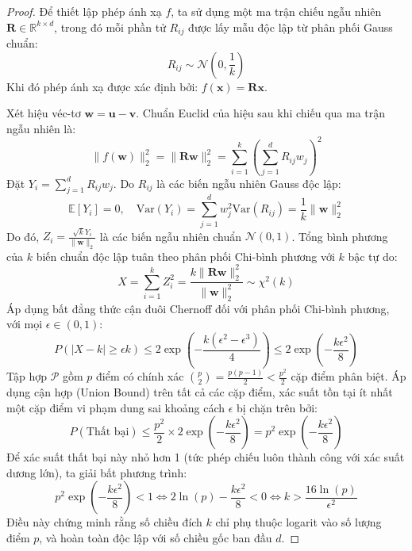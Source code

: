 \begin{proof}
Để thiết lập phép ánh xạ $f$, ta sử dụng một ma trận chiếu ngẫu nhiên $\mathbf{R} \in \mathbb{R}^{k \times d}$, trong đó mỗi phần tử $R_{ij}$ được lấy mẫu độc lập từ phân phối Gauss chuẩn:
\begin{equation*}
R_{ij} \sim \mathcal{N}\left(0, \frac{1}{k}\right)
\end{equation*}
Khi đó phép ánh xạ được xác định bởi: $f(\mathbf{x}) = \mathbf{R}\mathbf{x}$.

Xét hiệu véc-tơ $\mathbf{w} = \mathbf{u} - \mathbf{v}$. Chuẩn Euclid của hiệu sau khi chiếu qua ma trận ngẫu nhiên là:
\begin{equation*}
\|f(\mathbf{w})\|_2^2 = \|\mathbf{R}\mathbf{w}\|_2^2 = \sum_{i=1}^k \left(\sum_{j=1}^d R_{ij} w_j\right)^2
\end{equation*}
Đặt $Y_i = \sum_{j=1}^d R_{ij} w_j$. Do $R_{ij}$ là các biến ngẫu nhiên Gauss độc lập:
\begin{equation*}
\mathbb{E}[Y_i] = 0, \quad \text{Var}(Y_i) = \sum_{j=1}^d w_j^2 \text{Var}(R_{ij}) = \frac{1}{k} \|\mathbf{w}\|_2^2
\end{equation*}
Do đó, $Z_i = \frac{\sqrt{k} Y_i}{\|\mathbf{w}\|_2}$ là các biến ngẫu nhiên chuẩn $\mathcal{N}(0, 1)$. Tổng bình phương của $k$ biến chuẩn độc lập tuân theo phân phối Chi-bình phương với $k$ bậc tự do:
\begin{equation*}
X = \sum_{i=1}^k Z_i^2 = \frac{k \|\mathbf{R}\mathbf{w}\|_2^2}{\|\mathbf{w}\|_2^2} \sim \chi^2(k)
\end{equation*}
Áp dụng bất đẳng thức cận đuôi Chernoff đối với phân phối Chi-bình phương, với mọi $\epsilon \in (0, 1)$:
\begin{equation*}
P\left( |X - k| \ge \epsilon k \right) \le 2 \exp\left( -\frac{k (\epsilon^2 - \epsilon^3)}{4} \right) \le 2 \exp\left( -\frac{k \epsilon^2}{8} \right)
\end{equation*}
Tập hợp $\mathcal{P}$ gồm $p$ điểm có chính xác $\binom{p}{2} = \frac{p(p-1)}{2} < \frac{p^2}{2}$ cặp điểm phân biệt.
Áp dụng cận hợp (Union Bound) trên tất cả các cặp điểm, xác suất tồn tại ít nhất một cặp điểm vi phạm dung sai khoảng cách $\epsilon$ bị chặn trên bởi:
\begin{equation*}
P(\text{Thất bại}) \le \frac{p^2}{2} \times 2 \exp\left(-\frac{k \epsilon^2}{8}\right) = p^2 \exp\left(-\frac{k \epsilon^2}{8}\right)
\end{equation*}
Để xác suất thất bại này nhỏ hơn 1 (tức phép chiếu luôn thành công với xác suất dương lớn), ta giải bất phương trình:
\begin{equation*}
p^2 \exp\left(-\frac{k \epsilon^2}{8}\right) < 1 \iff 2 \ln(p) - \frac{k \epsilon^2}{8} < 0 \iff k > \frac{16 \ln(p)}{\epsilon^2}
\end{equation*}
Điều này chứng minh rằng số chiều đích $k$ chỉ phụ thuộc logarit vào số lượng điểm $p$, và hoàn toàn độc lập với số chiều gốc ban đầu $d$.
\end{proof}

